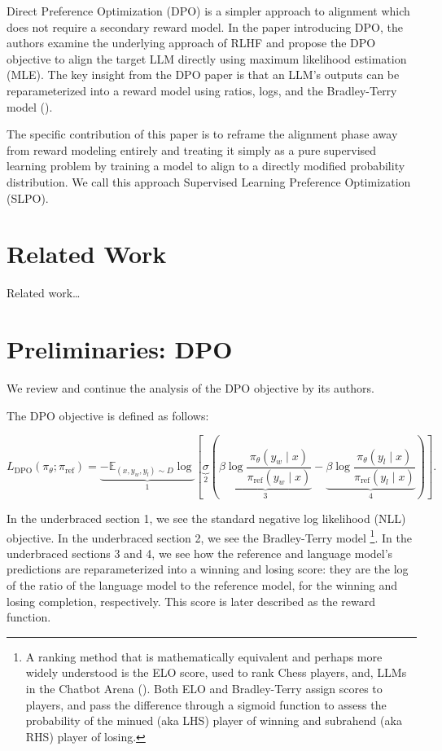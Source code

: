 \documentclass[twoside,11pt]{article}
\begin{document}
Direct Preference Optimization (DPO) is a simpler approach to alignment
which does not require a secondary reward model. In the paper introducing
DPO, the authors examine the underlying
approach of RLHF and propose
the DPO objective to align the target LLM directly using
maximum likelihood estimation (MLE). 
The key insight from the DPO paper is that an LLM's
outputs can be reparameterized into a reward model using ratios, logs,
and the Bradley-Terry model (\cite{bradley1952rank}).

The specific contribution of this paper is to reframe the alignment
phase away from reward modeling entirely and treating it simply as
a pure supervised learning problem by training a model to align to
a directly modified probability distribution. We call this
approach Supervised Learning Preference Optimization (SLPO).

\section{Related Work}

Related work\dots

\section{Preliminaries: DPO}

We review and continue the analysis of the DPO objective by its 
authors.

The DPO objective is defined as follows:

\begin{equation}
  \label{eq:dpo}
  L_\mathrm{DPO}(\pi_\theta; \pi_\mathrm{ref}) =
  \underbrace{
  -\mathbb{E}_{(x, y_w, y_l) \sim D} 
  \log }_{1} 
  \left[ 
    \underbrace{\sigma }_{2}
    \left(
    \underbrace{\beta \log \frac{\pi_\theta(y_w \mid x)}{\pi_\mathrm{ref}(y_w \mid x)}}_{3}
    - \underbrace{\beta \log \frac{\pi_\theta(y_l \mid x)}{\pi_\mathrm{ref}(y_l \mid x)}}_{4} 
    \right)
  \right].
\end{equation}

In the underbraced section 1, we see the standard 
negative log likelihood (NLL) objective.
In the underbraced section 2, we see the Bradley-Terry model 
\footnote{A ranking method that is mathematically equivalent and perhaps more 
widely understood is the ELO score, used to rank Chess players, 
and, LLMs in the Chatbot Arena (\cite{elo1978rating,chiang2024chatbot}). 
Both ELO and Bradley-Terry assign scores to players, and 
pass the difference through a sigmoid function to assess the probability of 
the minued (aka LHS) player of winning and subrahend (aka RHS) player of losing.}.
In the underbraced sections 3 and 4, we see how the 
reference and language model's predictions are reparameterized
into a winning and losing score: they are the 
log of the ratio of the language model to the reference model, for the winning and 
losing completion, respectively. 
This score is later described as the reward function.
\end{document}
